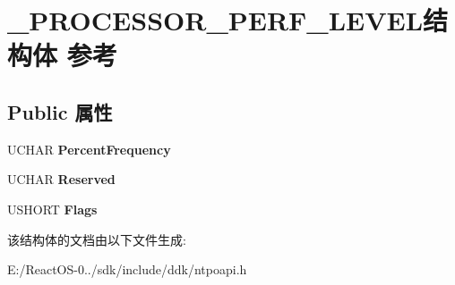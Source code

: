 \hypertarget{struct___p_r_o_c_e_s_s_o_r___p_e_r_f___l_e_v_e_l}{}\section{\+\_\+\+P\+R\+O\+C\+E\+S\+S\+O\+R\+\_\+\+P\+E\+R\+F\+\_\+\+L\+E\+V\+E\+L结构体 参考}
\label{struct___p_r_o_c_e_s_s_o_r___p_e_r_f___l_e_v_e_l}
\subsection*{Public 属性}
\begin{DoxyCompactItemize}
\item 
\mbox{\label{struct___p_r_o_c_e_s_s_o_r___p_e_r_f___l_e_v_e_l_ac2dba458b4440adef98fb504d545963b}} 
U\+C\+H\+AR {\bfseries Percent\+Frequency}
\item 
\mbox{\label{struct___p_r_o_c_e_s_s_o_r___p_e_r_f___l_e_v_e_l_a331b8b821d954165a95a5716e9b224f8}} 
U\+C\+H\+AR {\bfseries Reserved}
\item 
\mbox{\label{struct___p_r_o_c_e_s_s_o_r___p_e_r_f___l_e_v_e_l_a144ba4b320005b45f88a3a9dbce5846b}} 
U\+S\+H\+O\+RT {\bfseries Flags}
\end{DoxyCompactItemize}


该结构体的文档由以下文件生成\+:\begin{DoxyCompactItemize}
\item 
E\+:/\+React\+O\+S-\/0../sdk/include/ddk/ntpoapi.\+h\end{DoxyCompactItemize}
